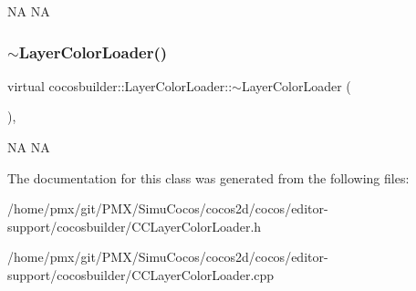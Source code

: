 NA  NA \mbox{\label{classcocosbuilder_1_1LayerColorLoader_aab0b9805055647ceb1d06c0821082a05}} 
\subsubsection{\texorpdfstring{$\sim$\+Layer\+Color\+Loader()}{~LayerColorLoader()}\hspace{0.1cm}{\footnotesize\ttfamily [2/2]}}
{\footnotesize\ttfamily virtual cocosbuilder\+::\+Layer\+Color\+Loader\+::$\sim$\+Layer\+Color\+Loader (\begin{DoxyParamCaption}{ }\end{DoxyParamCaption})\hspace{0.3cm}{\ttfamily [inline]}, {\ttfamily [virtual]}}

NA  NA 

The documentation for this class was generated from the following files\+:\begin{DoxyCompactItemize}
\item 
/home/pmx/git/\+P\+M\+X/\+Simu\+Cocos/cocos2d/cocos/editor-\/support/cocosbuilder/C\+C\+Layer\+Color\+Loader.\+h\item 
/home/pmx/git/\+P\+M\+X/\+Simu\+Cocos/cocos2d/cocos/editor-\/support/cocosbuilder/C\+C\+Layer\+Color\+Loader.\+cpp\end{DoxyCompactItemize}
